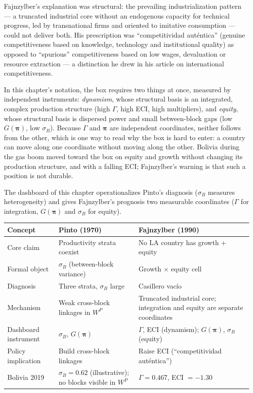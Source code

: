 \documentclass[../structural_economics_book.tex]{subfiles}
\begin{document}
Fajnzylber's explanation was structural: the prevailing industrialization pattern --- a truncated industrial core without an endogenous capacity for technical progress, led by transnational firms and oriented to imitative consumption --- could not deliver both. His prescription was ``competitividad aut\'{e}ntica'' (genuine competitiveness based on knowledge, technology and institutional quality) as opposed to ``spurious'' competitiveness based on low wages, devaluation or resource extraction --- a distinction he drew in his \citeyear{fajnzylber1988competitividad} article on international competitiveness.

In this chapter's notation, the box requires two things at once, measured by independent instruments: \emph{dynamism}, whose structural basis is an integrated, complex production structure (high $\Gamma$, high ECI, high multipliers), and \emph{equity}, whose structural basis is dispersed power and small between-block gaps (low $G(\boldsymbol{\pi})$, low $\sigma_B$). Because $\Gamma$ and $\boldsymbol{\pi}$ are independent coordinates, neither follows from the other, which is one way to read why the box is hard to enter: a country can move along one coordinate without moving along the other. Bolivia during the gas boom moved toward the box on equity and growth without changing its production structure, and with a falling ECI; Fajnzylber's warning is that such a position is not durable.

The dashboard of this chapter operationalizes Pinto's diagnosis ($\sigma_B$ measures heterogeneity) and gives Fajnzylber's prognosis two measurable coordinates ($\Gamma$ for integration, $G(\boldsymbol{\pi})$ and $\sigma_B$ for equity).

\begin{center}
\begin{tabularx}{\textwidth}{LLL}
\toprule
\textbf{Concept} & \textbf{Pinto (1970)} & \textbf{Fajnzylber (1990)} \\
\midrule
Core claim & Productivity strata coexist & No LA country has growth + equity \\
Formal object & $\sigma_B$ (between-block variance) & Growth $\times$ equity cell \\
Diagnosis & Three strata, $\sigma_B$ large & Casillero vac\'{i}o \\
Mechanism & Weak cross-block linkages in $W^P$ & Truncated industrial core; integration and equity are separate coordinates \\
Dashboard instrument & $\sigma_B$, $G(\boldsymbol{\pi})$ & $\Gamma$, ECI (dynamism); $G(\boldsymbol{\pi})$, $\sigma_B$ (equity) \\
Policy implication & Build cross-block linkages & Raise ECI (``competitividad aut\'{e}ntica'') \\
Bolivia 2019 & $\sigma_B = 0.62$ (illustrative); no blocks visible in $W^P$ & $\Gamma = 0.467$, ECI $= -1.30$ \\
\bottomrule
\end{tabularx}
\end{center}
\end{document}
